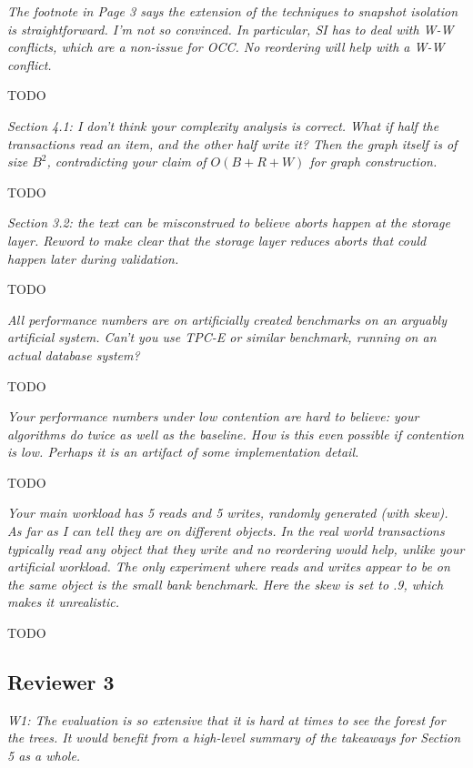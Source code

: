 \documentclass{article}
\begin{document}
\emph{The footnote in Page 3 says the extension of the techniques to snapshot isolation is straightforward. I'm not so convinced. In particular, SI has to deal with W-W conflicts, which are a non-issue for OCC. No reordering will help with a W-W conflict.
}


\bigskip
TODO
\bigskip

\emph{Section 4.1: I don't think your complexity analysis is correct. What if half the transactions read an item, and the other half write it? Then the graph itself is of size $B^2$, contradicting your claim of $O(B+R+W)$ for graph construction.}


\bigskip
TODO
\bigskip

\emph{Section 3.2: the text can be misconstrued to believe aborts happen at the storage layer. Reword to make clear that the storage layer reduces aborts that could happen later during validation.}


\bigskip
TODO
\bigskip

\emph{All performance numbers are on artificially created benchmarks on an arguably artificial system. Can't you use TPC-E or similar benchmark, running on an actual database system?}


\bigskip
TODO
\bigskip

\emph{Your performance numbers under low contention are hard to believe: your algorithms do twice as well as the baseline. How is this even possible if contention is low. Perhaps it is an artifact of some implementation detail.}


\bigskip
TODO
\bigskip

\emph{Your main workload has 5 reads and 5 writes, randomly generated (with skew). As far as I can tell they are on different objects. In the real world transactions typically read any object that they write and no reordering would help, unlike your artificial workload. The only experiment where reads and writes appear to be on the same object is the small bank benchmark. Here the skew is set to .9, which makes it unrealistic. }


\bigskip
TODO
\bigskip

\subsection{Reviewer 3}

\emph{W1: The evaluation is so extensive that it is hard at times to see the forest for the trees. It would benefit from a high-level summary of the takeaways for Section 5 as a whole. }
\end{document}
